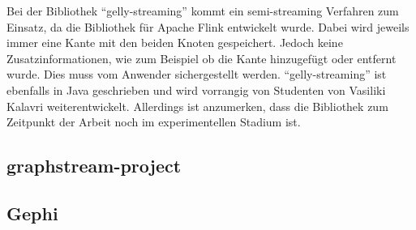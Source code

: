 Bei der Bibliothek \enquote{gelly-streaming} kommt ein semi-streaming Verfahren
zum Einsatz, da die Bibliothek für Apache Flink entwickelt wurde. Dabei wird
jeweils immer eine Kante mit den beiden Knoten gespeichert. Jedoch keine
Zusatzinformationen, wie zum Beispiel ob die Kante hinzugefügt oder entfernt
wurde. Dies muss vom Anwender sichergestellt werden. \enquote{gelly-streaming}
ist ebenfalls in Java geschrieben und wird vorrangig von Studenten von
Vasiliki Kalavri weiterentwickelt. Allerdings ist anzumerken, dass die Bibliothek
zum Zeitpunkt der Arbeit noch im experimentellen Stadium ist.

\subsection{graphstream-project}
\subsection{Gephi}
